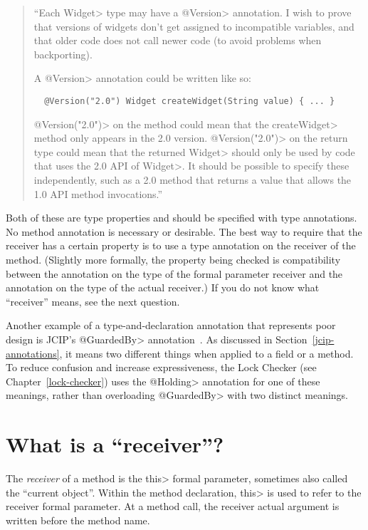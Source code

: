 \begin{quote}
  ``Each \<Widget> type may have a \<@Version> annotation.
  I wish to prove that versions of widgets don't get assigned to
  incompatible variables, and that older code does not call newer code (to
  avoid problems when backporting).

  A \<@Version> annotation could be written like so:

\begin{Verbatim}
  @Version("2.0") Widget createWidget(String value) { ... }
\end{Verbatim}

\<@Version("2.0")> on the method could mean that the \<createWidget> method
only appears in the 2.0 version.  \<@Version("2.0")> on the return type
could mean that the returned \<Widget> should only be used by code that
uses the 2.0 API of \<Widget>.  It should be possible to specify these
independently, such as a 2.0 method that returns a value that allows the
1.0 API method invocations.''
\end{quote}

Both of these are type properties and should be specified with type
annotations.  No method annotation is necessary or desirable.  The best way
to require that the receiver has a certain property is to use a type
annotation on the receiver of the method.  (Slightly more formally, the
property being checked is compatibility between the annotation on the type
of the formal parameter receiver and the annotation on the type of the
actual receiver.)  If you do not know what ``receiver'' means, see the next
question.


Another example of a type-and-declaration annotation that represents poor
design is JCIP's \<@GuardedBy> annotation~\cite{Goetz2006}.  As discussed
in Section~\ref{jcip-annotations}, it means two different things when
applied to a field or a method.  To reduce confusion and increase
expressiveness, the Lock Checker (see Chapter~\ref{lock-checker}) uses the
\<@Holding> annotation for one of these meanings, rather than overloading
\<@GuardedBy> with two distinct meanings.



\section{What is a ``receiver''?\label{faq-receiver}}

The \emph{receiver} of a method is the \<this> formal parameter, sometimes
also called the ``current object''.  Within the method declaration, \<this>
is used to refer to the receiver formal parameter.  At a method call, the
receiver actual argument is written before the method name.

